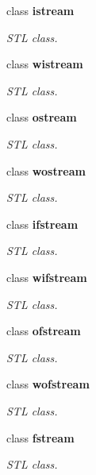 \begin{DoxyCompactItemize}
class {\bfseries istream}
\begin{DoxyCompactList}\small\item\em STL class. \item\end{DoxyCompactList}\item 
class {\bfseries wistream}
\begin{DoxyCompactList}\small\item\em STL class. \item\end{DoxyCompactList}\item 
class {\bfseries ostream}
\begin{DoxyCompactList}\small\item\em STL class. \item\end{DoxyCompactList}\item 
class {\bfseries wostream}
\begin{DoxyCompactList}\small\item\em STL class. \item\end{DoxyCompactList}\item 
class {\bfseries ifstream}
\begin{DoxyCompactList}\small\item\em STL class. \item\end{DoxyCompactList}\item 
class {\bfseries wifstream}
\begin{DoxyCompactList}\small\item\em STL class. \item\end{DoxyCompactList}\item 
class {\bfseries ofstream}
\begin{DoxyCompactList}\small\item\em STL class. \item\end{DoxyCompactList}\item 
class {\bfseries wofstream}
\begin{DoxyCompactList}\small\item\em STL class. \item\end{DoxyCompactList}\item 
class {\bfseries fstream}
\begin{DoxyCompactList}\small\item\em STL class. \item\end{DoxyCompactList}\item 

\end{DoxyCompactItemize}
